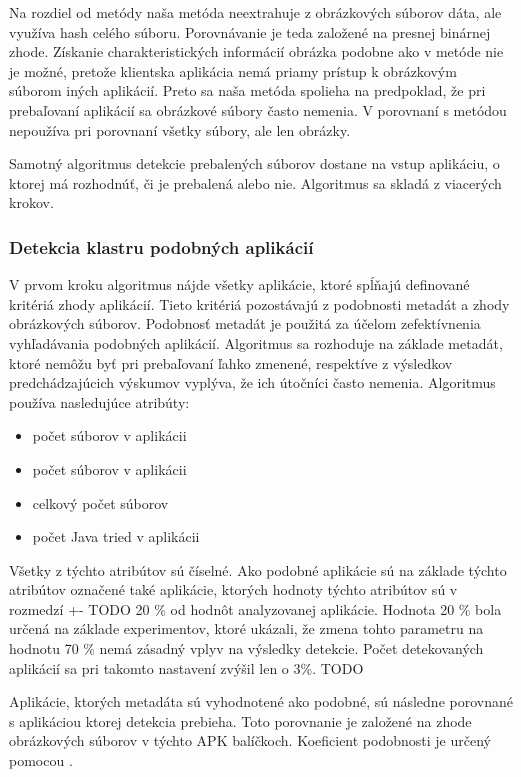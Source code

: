 Na rozdiel od metódy  naša metóda neextrahuje z obrázkových súborov dáta, ale využíva hash celého súboru. Porovnávanie je teda založené na presnej binárnej zhode. Získanie charakteristických informácií obrázka podobne ako v metóde  nie je možné, pretože klientska aplikácia nemá priamy prístup k obrázkovým súborom iných aplikácií. Preto sa naša metóda spolieha na predpoklad, že pri prebaľovaní aplikácií sa obrázkové súbory často nemenia. 
V porovnaní s metódou  nepoužíva  pri porovnaní všetky súbory, ale len  obrázky.

Samotný algoritmus detekcie prebalených súborov dostane na vstup aplikáciu, o ktorej má rozhodnúť, či je prebalená alebo nie. Algoritmus sa skladá z viacerých krokov.

\subsubsection{\textbf{Detekcia klastru podobných aplikácií}} 

V prvom kroku algoritmus nájde všetky aplikácie, ktoré spĺňajú definované kritériá zhody aplikácií. Tieto kritériá pozostávajú z podobnosti metadát a zhody obrázkových súborov. 
Podobnosť metadát je použitá za účelom zefektívnenia vyhľadávania podobných aplikácií. Algoritmus sa rozhoduje na základe metadát, ktoré nemôžu byť pri prebaľovaní ľahko zmenené, respektíve z výsledkov predchádzajúcich výskumov vyplýva, že ich útočníci často nemenia. \newline \noindent Algoritmus používa nasledujúce atribúty:
\begin{itemize}
	\item počet  súborov v aplikácii
	\item počet  súborov v aplikácii
	\item celkový počet súborov
	\item počet Java tried v aplikácii
\end{itemize}

Všetky z týchto atribútov sú číselné. Ako podobné aplikácie sú na základe týchto atribútov označené také aplikácie, ktorých hodnoty týchto atribútov sú v rozmedzí +- TODO 20 \% od hodnôt analyzovanej aplikácie. Hodnota 20 \% bola určená na základe experimentov, ktoré ukázali, že zmena tohto parametru na hodnotu 70 \% nemá zásadný vplyv na výsledky detekcie. Počet detekovaných aplikácií sa pri takomto nastavení zvýšil len o 3\%. TODO

Aplikácie, ktorých metadáta sú vyhodnotené ako podobné, sú následne porovnané s aplikáciou ktorej detekcia prebieha. Toto porovnanie je založené na zhode obrázkových  súborov v týchto APK balíčkoch.  Koeficient podobnosti je určený pomocou .

